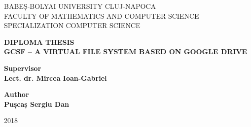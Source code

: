\begin{titlepage}
\sloppy
\begin{center}
\normalsize{BABEȘ-BOLYAI UNIVERSITY CLUJ-NAPOCA}\\
\normalsize{FACULTY OF MATHEMATICS AND COMPUTER SCIENCE}\\
\normalsize{SPECIALIZATION COMPUTER SCIENCE}\\
\end{center}

\vspace{2cm}
\begin{center}
\huge \textbf{DIPLOMA THESIS}\\
\vspace{1cm}
\Huge \textbf{GCSF -- A VIRTUAL FILE SYSTEM BASED ON GOOGLE DRIVE}
\end{center}

\vspace{2cm}

\begin{flushleft}
\large \textbf{Supervisor} \\
\large \textbf{Lect. dr. Mircea Ioan-Gabriel}
\end{flushleft}

\vspace{1cm}

\begin{flushright}
\large \textbf{Author} \\
\large \textbf{Pușcaș Sergiu Dan}
\end{flushright}

\vspace{3cm}
\begin{center}
\Large{2018}
\end{center}

\end{titlepage}
